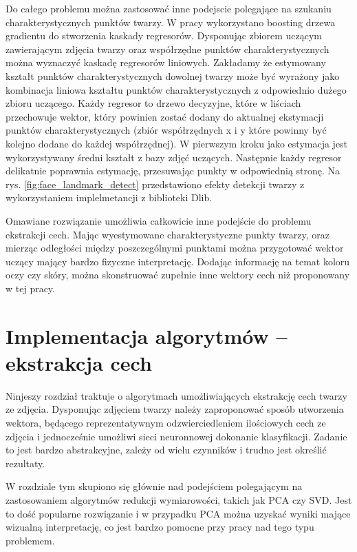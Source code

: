 \documentclass[oneside, eng]{mgr}
\begin{document}
Do całego problemu można zastosować inne podejscie polegające na szukaniu charakterystycznych punktów twarzy. W pracy \cite{Landmark face detector} wykorzystano boosting drzewa gradientu do stworzenia kaskady regresorów. Dysponując zbiorem uczącym zawierającym zdjęcia twarzy oraz współrzędne punktów charakterystycznych można wyznaczyć kaskadę regresorów liniowych. Zakładamy że estymowany kształt punktów charakterystycznych dowolnej twarzy może być wyrażony jako kombinacja liniowa kształtu punktów charakterystycznych z odpowiednio dużego zbioru uczącego. Każdy regresor to drzewo decyzyjne, które w liściach przechowuje wektor, który powinien zostać dodany do aktualnej ekstymacji punktów charakterystycznych (zbiór współrzędnych x i y które powinny być kolejno dodane do każdej współrzędnej). W pierwszym kroku jako estymacja jest wykorzystywany średni kształt z bazy zdjęć uczących. Następnie każdy regresor delikatnie poprawnia estymację, przesuwając punkty w odpowiednią stronę. Na rys. \ref{fig:face_landmark_detect} przedstawiono efekty detekcji twarzy z wykorzystaniem implelmetancji z biblioteki Dlib.

Omawiane rozwiązanie umożliwia całkowicie inne podejście do problemu ekstrakcji cech. Mając wyestymowane charakterystyczne punkty twarzy, oraz mierząc odległości między poszczególnymi punktami można przygotować wektor uczący mający bardzo fizyczne interpretację. Dodając informację na temat koloru oczy czy skóry, można skonstruować zupełnie inne wektory cech niż proponowany w tej pracy. 

\newpage
 
\chapter{Implementacja algorytmów – ekstrakcja cech}

Ninjeszy rozdział traktuje o algorytmach umożliwiających ekstrakcję cech twarzy ze zdjęcia. Dysponując zdjęciem twarzy należy zaproponować sposób utworzenia wektora, będącego reprezentatywnym odzwierciedleniem ilościowych cech ze zdjęcia i jednocześnie umożliwi sieci neuronnowej dokonanie klasyfikacji. Zadanie to jest bardzo abstrakcyjne, zależy od wielu czynników i trudno jest określić rezultaty.

W rozdziale tym skupiono się głównie nad podejściem polegającym na zastosowaniem algorytmów redukcji wymiarowości, takich jak PCA czy SVD. Jest to dość popularne rozwiązanie i w przypadku PCA można uzyskać wyniki mające wizualną interpretację, co jest bardzo pomocne przy pracy nad tego typu problemem.
\end{document}
